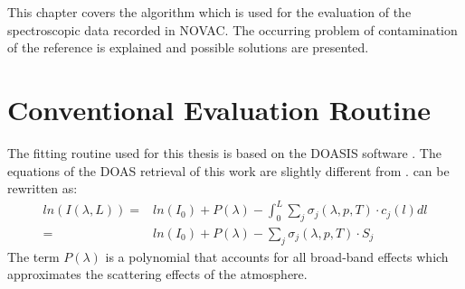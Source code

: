 

This chapter covers the algorithm which is used for the evaluation of the spectroscopic data recorded in NOVAC. 
The occurring problem of contamination of the reference is explained and possible solutions are presented.

\section{Conventional Evaluation Routine}
The fitting routine used for this thesis is based on the DOASIS software \cite{kraus2006doasis}. 
The equations of the DOAS retrieval of this work are slightly different from .
 can be rewritten as:
\begin{align}
ln\left(I\left(\lambda, L\right)\right) = &ln\left(I_0 \right) + P \left(\lambda\right) -	\int_{0}^{L}\sum_{j}\sigma_j \left(\lambda, p, T \right) \cdot c_j \left(l\right)dl \nonumber \\
= &ln\left(I_0 \right) + P \left(\lambda\right)-
\sum_{j}\sigma_j \left(\lambda, p, T \right) \cdot S_j
\label{eq:lben}
\end{align}
%
The term $ P \left(\lambda\right)$ is a polynomial that accounts for all broad-band effects which approximates the scattering effects of the atmosphere.

